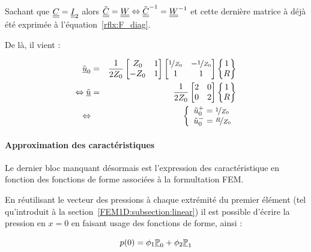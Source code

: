 Sachant que $\underline{\underline{C}} = \underline{\underline{I}}_2$ alors $\tilde{\underline{\underline{C}}} = \underline{\underline{W}} \Leftrightarrow \tilde{\underline{\underline{C}}}^{-1} = \underline{\underline{W}}^{-1}$ et cette
dernière matrice à déjà été exprimée à l'équation~\eqref{rflx:F_diag}.

De là, il vient :

\begin{eqnarray}
	\tilde{\underline{u}}_0 & = & \frac{1}{2Z_0}
					\begin{bmatrix}Z_0 & 1\\-Z_0 & 1\end{bmatrix}
					\begin{bmatrix}\nicefrac{1}{Z_0} & - \nicefrac{1}{Z_0}\\1 & 1\end{bmatrix}
					\begin{Bmatrix}1\\R\end{Bmatrix}\notag\\
	\Leftrightarrow \tilde{\underline{u}} & = & \frac{1}{2Z_0}
					\begin{bmatrix}2&0\\0&2\end{bmatrix}
					\begin{Bmatrix}1\\R\end{Bmatrix}\notag\\
	\Leftrightarrow &&
			\left\{\begin{array}{l}
				\tilde{u}_0^+ = \nicefrac{1}{Z_0}\\
				\tilde{u}_0^- = \nicefrac{R}{Z_0}
		 	\end{array}\right.
\end{eqnarray}

\paragraph{Approximation des caractéristiques}

Le dernier bloc manquant désormais est l'expression des caractéristique en fonction des fonctions de forme associées à
la formultation FEM.

En réutilisant le vecteur des pressions à chaque extrémité du premier élément (tel qu'introduit à la
section~\ref{FEM1D:subsection:linear}) il est possible d'écrire la pression en $x=0$ en faisant usage des fonctions de
forme, ainsi :

\begin{equation*}
	p(0) = \phi_1\underline{\mathbb{P}}_0 + \phi_2\underline{\mathbb{P}}_1
\end{equation*}

